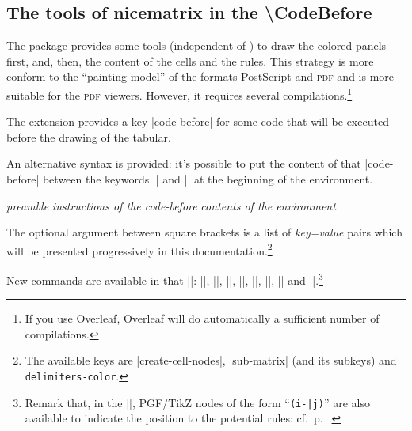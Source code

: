 \documentclass[dvipsnames]{article}%
\begin{document}
\subsection{The tools of nicematrix in the \textbackslash CodeBefore}

\label{color-in-code-before}

The package  provides some tools (independent of )
to draw the colored panels first, and, then, the content of the cells and the
rules. This strategy is more conform to the ``painting model'' of the formats
PostScript and \textsc{pdf} and is more suitable for the \textsc{pdf} viewers.
However, it requires several compilations.\footnote{If you use Overleaf,
  Overleaf will do automatically a sufficient number of compilations.}

\medskip
The extension  provides a key |code-before| for some code that
will be executed before the drawing of the tabular. 

\medskip 
An alternative syntax is provided: it's possible to put the content of that
|code-before| between the keywords |\CodeBefore| and |\Body| at the beginning
of the environment.

\begin{Code}
\begin{pNiceArray}{\textsl{preamble}}
\emph{}
  \textsl{instructions of the code-before}
\emph{\Body}
  \textsl{contents of the environment}
\end{pNiceArray}
\end{Code}

\smallskip
The optional argument between square brackets is a list of \textsl{key=value}
pairs which will be presented progressively in this
documentation.\footnote{The available keys are |create-cell-nodes|,
|sub-matrix| (and its subkeys) and \texttt{delimiters-color}.}

\medskip
New commands are available in that |\CodeBefore|: |\cellcolor|,
|\rectanglecolor|, |\rowcolor|, |\columncolor|, |\rowcolors|,
|\rowlistcolors|, |\chessboardcolors| and |\arraycolor|.\footnote{Remark that,
in the |\CodeBefore|, PGF/TikZ nodes of the form ``\verb+(i-|j)+'' are
also available to indicate the position to the potential rules:
cf.~p.~\pageref{nodes-i}.}
\label{code-before}
\end{document}
